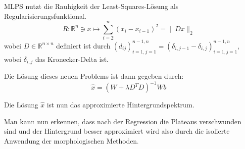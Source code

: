 \documentclass{article}
\newcommand{\R}[0]{\mathbb{R}}
\begin{document}
MLPS nutzt die Rauhigkeit der Least-Squares-Lösung als Regularisierungsfunktional.
\begin{equation}
    R: \R^n \ni x \mapsto \sum_{i=2}^{n} (x_i - x_{i-1})^2 = \lVert Dx \rVert_2
\end{equation}
wobei $D \in \R^{n\times n}$ definiert ist durch $(d_{ij})_{i=1,j=1}^{n-1,n} = (\delta_{i,j-1} - \delta_{i,j})_{i=1,j=1}^{n-1,n}$, wobei $\delta_{i,j}$ das Kronecker-Delta ist.

Die Lösung dieses neuen Problems ist dann gegeben durch:
\begin{equation}
    \hat{x} = (W + \lambda D^TD)^{-1}Wb
\end{equation}

Die Lösung $\hat{x}$ ist nun das approximierte Hintergrundspektrum.

Man kann nun erkennen, dass nach der Regression die Plateaus verschwunden sind und der Hintergrund besser approximiert wird also durch die isolierte Anwendung der morphologischen Methoden. 
\end{document}
